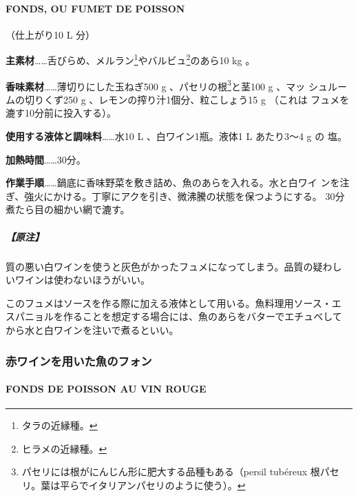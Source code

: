 \documentclass[twoside,12Q,b5j]{escoffierltjsbook}
\newenvironment{recette}{\begin{multicols}{2}}{\end{multicols}}
\begin{document}
\begin{recette}
\paragraph{FONDS, OU FUMET DE POISSON}\label{fonds-ou-fumet-de-poisson}


（仕上がり10 L 分）

\textbf{主素材}\ldots{}\ldots{}舌びらめ、メルラン\footnote{タラの近縁種。}やバルビュ\footnote{ヒラメの近縁種。}のあら10
kg 。

\textbf{香味素材}\ldots{}\ldots{}薄切りにした玉ねぎ500 g
、パセリの根\footnote{パセリには根がにんじん形に肥大する品種もある（persil
  tubéreux 根パセリ。葉は平らでイタリアンパセリのように使う）。}と茎100
g 、マッ シュルームの切りくず250 g 、レモンの搾り汁1個分、粒こしょう15 g
（これは フュメを漉す10分前に投入する）。

\textbf{使用する液体と調味料}\ldots{}\ldots{}水10 L 、白ワイン1瓶。液体1
L あたり3〜4 g の 塩。

\textbf{加熱時間}\ldots{}\ldots{}30分。

\textbf{作業手順}\ldots{}\ldots{}鍋底に香味野菜を敷き詰め、魚のあらを入れる。水と白ワイ
ンを注ぎ、強火にかける。丁寧にアクを引き、微沸騰の状態を保つようにする。
30分煮たら目の細かい網で漉す。

\subparagraph{【原注】}\label{ux539fux6ce8-2}

質の悪い白ワインを使うと灰色がかったフュメになってしまう。品質の疑わし
いワインは使わないほうがいい。

このフュメはソースを作る際に加える液体として用いる。魚料理用ソース・エ
スパニョルを作ることを想定する場合には、魚のあらをバターでエチュベして
から水と白ワインを注いで煮るといい。

\vspace*{2\zw}

\subsubsection{赤ワインを用いた魚のフォン}\label{ux8d64ux30efux30a4ux30f3ux3092ux7528ux3044ux305fux9b5aux306eux30d5ux30a9ux30f3}

\paragraph{FONDS DE POISSON AU VIN
ROUGE}\label{fonds-de-poisson-au-vin-rouge}


\end{recette}
\end{document}
